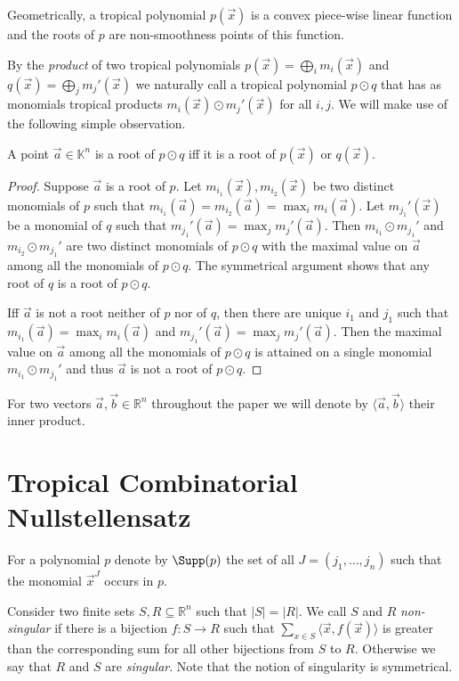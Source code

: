 \documentclass[11pt]{article}
\newcommand{\tp}{\odot}
\newcommand{\bb}[1]{\mathbb{#1}}
\begin{document}
Geometrically, a tropical polynomial $p(\vec{x})$ is a convex piece-wise linear function and the roots of $p$ are non-smoothness points of this function.

By the \emph{product} of  two tropical polynomials $p(\vec{x}) = \bigoplus_i m_i(\vec{x})$ and $q(\vec{x}) = \bigoplus_j m_j'(\vec{x})$ we naturally call a tropical polynomial $p \tp q$ that has as monomials tropical products $m_i(\vec{x}) \tp m_j'(\vec{x})$ for all $i,j$. We will make use of the following simple observation.

\begin{lemma} \label{lem:tropical_polynomials_product}
A point $\vec{a} \in \bb{K}^n$ is a root of $p \tp q$ iff it is a root of $p(\vec{x})$ or $q(\vec{x})$.
\end{lemma}
\begin{proof}
Suppose $\vec{a}$ is a root of $p$. Let $m_{i_1}(\vec{x}), m_{i_2}(\vec{x})$ be two distinct monomials of $p$ such that $m_{i_1}(\vec{a})=m_{i_2}(\vec{a}) = \max_i m_{i}(\vec{a})$. Let $m_{j_1}'(\vec{x})$ be a monomial of $q$ such that $m_{j_1}'(\vec{a})= \max_j m_{j}'(\vec{a})$. Then $m_{i_1} \tp m_{j_1}'$ and $m_{i_2} \tp m_{j_1}'$ are two distinct monomials of $p\tp q$ with the maximal value on $\vec{a}$ among all the monomials of $p \tp q$. The symmetrical argument shows that any root of $q$ is a root of $p \tp q$.

Iff $\vec{a}$ is not a root neither of $p$ nor of $q$, then there are unique $i_1$ and $j_1$ such that $m_{i_1}(\vec{a}) = \max_i m_{i}(\vec{a})$ and $m_{j_1}'(\vec{a})= \max_j m_{j}'(\vec{a})$. Then the maximal value on $\vec{a}$ among all the monomials of $p \tp q$ is attained on a single monomial $m_{i_1} \tp m_{j_1}'$ and thus $\vec{a}$ is not a root of $p \tp q$.
\end{proof}


For two vectors $\vec{a},\vec{b} \in \bb{R}^n$ throughout the paper we will denote by $\langle \vec{a}, \vec{b} \rangle$ their inner product.



\section{Tropical Combinatorial Nullstellensatz} \label{sec:comb_null}


For a polynomial $p$ denote 
by $\Supp(p)$ the set of all  $J=(j_1,\ldots,j_n)$ such that the  monomial $\vec{x}^J$ occurs in $p$. 

Consider two finite sets $S, R \subseteq \mathbb{R}^n$ such that $|S|=|R|$.
We call $S$ and $R$ \emph{non-singular} if there is a bijection $f\colon S \to R$ such that $\sum_{x\in S} \langle \vec{x}, f(\vec{x}) \rangle$ is greater than the corresponding sum for all other bijections from $S$ to $R$. Otherwise we say that $R$ and $S$ are \emph{singular}. Note that the notion of singularity is symmetrical.
\end{document}

